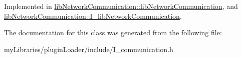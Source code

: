 Implemented in \mbox{\hyperlink{classlibNetworkCommunication_1_1libNetworkCommunication_a250d34be8725b543412b792e375972ac}{lib\+Network\+Communication\+::lib\+Network\+Communication}}, and \mbox{\hyperlink{classlibNetworkCommunication_1_1I__libNetworkCommunication_add643ce010a3712f9097dc36f45bfd50}{lib\+Network\+Communication\+::\+I\+\_\+lib\+Network\+Communication}}.



The documentation for this class was generated from the following file\+:\begin{DoxyCompactItemize}
\item 
my\+Libraries/plugin\+Loader/include/I\+\_\+communication.\+h\end{DoxyCompactItemize}
